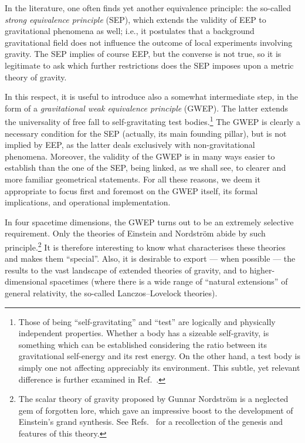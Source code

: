 \documentclass[a4paper,showkeys,aps,prd,reprint,nofootinbib,showpacs,twocolumn]{revtex4-1}
\theoremstyle{plain}
\begin{document}
In the literature, one often finds yet another equivalence principle: the so-called \emph{strong equivalence principle} (SEP), which extends the validity of EEP to gravitational phenomena as well; i.e., it postulates that a background gravitational field does not influence the outcome of local experiments involving gravity.  The SEP implies of course EEP, but the converse is not true, so it is legitimate to ask which further restrictions does the SEP imposes upon a metric theory of gravity.

In this respect, it is useful to introduce also a somewhat intermediate step, in the form of a \emph{gravitational weak equivalence principle} (GWEP). The latter extends the universality of free fall to self-gravitating test bodies.\footnote{Those of being ``self-gravitating'' and ``test''  are logically and physically independent properties.  Whether a body has a sizeable self-gravity, is something which can be established  considering the ratio between its gravitational self-energy and its rest energy.  On the other hand, a test body is simply one not affecting appreciably its environment. This subtle, yet relevant difference is further examined in Ref.~\cite{ess1}.} The GWEP is clearly a necessary condition for the SEP (actually, its main founding pillar), but is not implied by EEP, as the latter deals exclusively with non-gravitational phenomena.  Moreover, the validity of the GWEP is in many ways easier to establish than the one of the SEP, being linked, as we shall see, to clearer and more familiar geometrical statements. For all these reasons, we deem it appropriate to focus first and foremost on the GWEP itself, its formal implications, and operational implementation.

In four spacetime dimensions, the GWEP turns out to be an extremely selective requirement.  Only the theories of Einstein and Nordstr{\"o}m abide by such principle.\footnote{The scalar theory of gravity proposed by Gunnar Nordstr{\"o}m  is a neglected gem of forgotten lore, which gave an impressive boost to the development of Einstein's grand synthesis.  See Refs.~\cite{Ravndal:2004ym, Giulini:2006ry} for a recollection of the genesis and features of this theory.}  It is therefore interesting to know what characterises these theories and makes them ``special''.  Also, it is desirable to export --- when possible --- the results to the vast landscape of extended theories of gravity, and to higher-dimensional spacetimes (where there is a wide range of ``natural extensions'' of general relativity, the so-called Lanczos--Lovelock theories).
\end{document}
